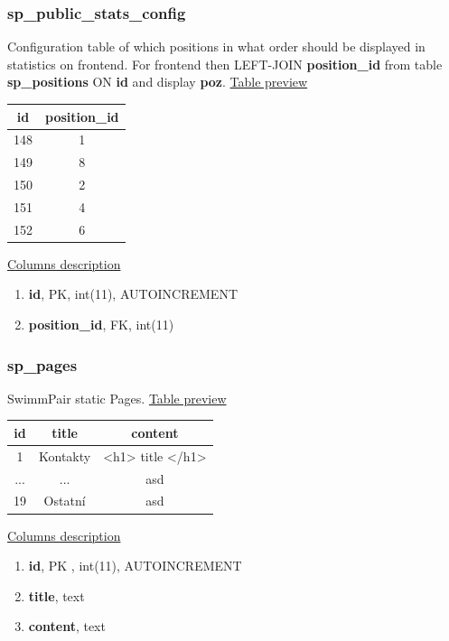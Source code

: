 \subsubsection*{sp\_public\_stats\_config}
Configuration table of which positions in what order should be displayed in statistics on frontend. For frontend then LEFT-JOIN \textbf{position\_id} from table \textbf{sp\_positions} ON \textbf{id} and display \textbf{poz}.
\newline
\underline{Table preview}
\begin{center}
 \begin{tabular}{||c c||} 
 \hline
 id & position\_id  \\ [0.5ex] 
 \hline\hline
 148 & 1 \\ 
 \hline
 149 & 8  \\ 
 \hline
 150 & 2  \\ 
 \hline
 151 & 4  \\ 
 \hline
 152 & 6  \\  
 \hline
 \end{tabular}
\end{center}
\underline{Columns description}
\begin{enumerate}
  \setlength\itemsep{0em}
  \item \textbf{id}, PK, int(11), AUTOINCREMENT
  \item \textbf{position\_id}, FK, int(11)
\end{enumerate}

\subsubsection*{sp\_pages}
SwimmPair static Pages.
\newline
\underline{Table preview}
\begin{center}
 \begin{tabular}{||c c c||} 
 \hline
 id & title & content \\ [0.5ex] 
 \hline\hline
 1 & Kontakty &  <h1> title </h1> \\
 \hline
 ... & ...  & asd \\ [0.5ex]
\hline
 19 & Ostatní  & asd \\
 \hline
\end{tabular}
\end{center}
\underline{Columns description}
\begin{enumerate}
  \setlength\itemsep{0em}
  \item \textbf{id}, PK , int(11), AUTOINCREMENT
  \item \textbf{title}, text
  \item \textbf{content}, text
\end{enumerate}

